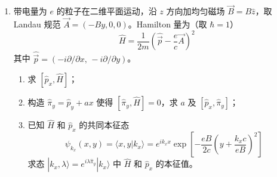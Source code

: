 \begin{enumerate}
{\begin{enumerate}
		\textbf{情形二：$0<E<V_0$}

		令 $\kappa=\sqrt{2m(V_0-E)}/\hbar$。$x>0$ 区域波函数衰减：
		\begin{align*}
			\psi_{\text{R}}(x)=t\,e^{-\kappa x}
		\end{align*}
		边界条件：
		\begin{align*}
			1+r=t,\qquad ik_1(1-r)=-\kappa t
		\end{align*}
		解得
		\begin{align*}
			r=\frac{ik_1+\kappa}{ik_1-\kappa},\qquad t=\frac{2ik_1}{ik_1-\kappa}
		\end{align*}

		\textbf{情形三：$E=V_0$}

		$x>0$ 区域方程为 $\psi''=0$，有界解为常数 $\psi_{\text{R}}=t$。由边界条件 $1+r=t$，$ik_1(1-r)=0$ 得 $r=1$，$t=2$。

		\item 入射波概率密度为 $|e^{ik_1 x}|^2=1$。

		\textbf{$E>V_0$ 时}：$x>0$ 的概率密度为
		\begin{align*}
			\rho_{\text{R}}=|t|^2=\frac{4k_1^2}{(k_1+k_2)^2}
		\end{align*}

		\textbf{$0<E<V_0$ 时}：$x>0$ 的概率密度为
		\begin{align*}
			\rho_{\text{R}}=|t|^2 e^{-2\kappa x}=\frac{4k_1^2}{k_1^2+\kappa^2}\,e^{-2\kappa x}
		\end{align*}

		\textbf{$E=V_0$ 时}：$\rho_{\text{R}}=|t|^2=4$。
	\end{enumerate}
	}

	\item
	带电量为 $e$ 的粒子在二维平面运动，沿 $z$ 方向加均匀磁场 $\vec{B}=B\hat{z}$，取 Landau 规范 $\vec{A}=(-By,0,0)$。Hamilton 量为（取 $\hbar=1$）
	\[
	\hat{H}=\frac{1}{2m}\left(\hat{\vec{p}}-\frac{e}{c}\vec{A}\right)^2
	\]
	其中 $\hat{\vec{p}}=(-i\partial/\partial x,\,-i\partial/\partial y)$。
	\begin{enumerate}
		\item 求 $[\hat{p}_x,\hat{H}]$；
		\item 构造 $\hat{\pi}_y=\hat{p}_y+ax$ 使得 $[\hat{\pi}_y,\hat{H}]=0$，求 $a$ 及 $[\hat{p}_x,\hat{\pi}_y]$；
		\item 已知 $\hat{H}$ 和 $\hat{p}_x$ 的共同本征态
		\[
		\psi_{k_x}(x,y)=\langle x,y|k_x\rangle=e^{ik_x x}\exp\!\left[-\frac{eB}{2c}\left(y+\frac{k_x c}{eB}\right)^2\right]
		\]
		求态 $|k_x,\lambda\rangle=e^{i\lambda\hat{\pi}_y}|k_x\rangle$ 中 $\hat{H}$ 和 $\hat{p}_x$ 的本征值。
	\end{enumerate}


\end{enumerate}
